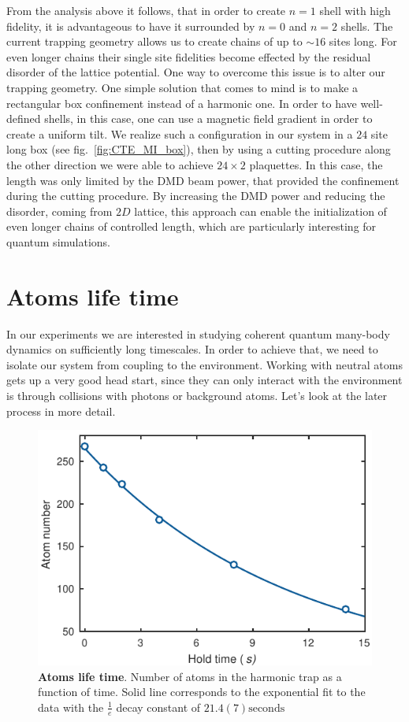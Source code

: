 From the analysis above it follows, that in order to create $n=1$ shell with high fidelity, it is advantageous to have it surrounded by $n=0$ and $n=2$ shells. The current trapping geometry allows us to create chains of up to $\sim 16$ sites long. For even longer chains their single site fidelities become effected by the residual disorder of the lattice potential. One way to overcome this issue is to alter our trapping geometry. One simple solution that comes to mind is to make a rectangular box confinement instead of a harmonic one. In order to have well-defined shells, in this case, one can use a magnetic field gradient in order to create a uniform tilt. We realize such a configuration in our system in a $24$ site long box (see fig.~\ref{fig:CTE_MI_box}), then by using a cutting procedure along the other direction we were able to achieve $24\times 2$ plaquettes. In this case, the length was only limited by the DMD beam power, that provided the confinement during the cutting procedure. By increasing the DMD power and reducing the disorder, coming from $2D$ lattice, this approach can enable the initialization of even longer chains of controlled length, which are particularly interesting for quantum simulations.

\section{Atoms life time}
In our experiments we are interested in studying coherent quantum many-body dynamics on sufficiently long timescales. In order to achieve that, we need to isolate our system from coupling to the environment. Working with neutral atoms gets up a very good head start, since they can only interact with the environment is through collisions with photons or background atoms. Let's look at the later process in more detail.

\begin{figure}[t]
	\centering
	\includegraphics[scale=1]{figures/CTE_lifetime.pdf}
	\caption{{\bf Atoms life time}. Number of atoms in the harmonic trap as  a function of time. Solid line corresponds to the exponential fit to the data with the $\frac{1}{e}$ decay constant of $21.4(7) \mathrm{seconds}$}
	\label{fig:CTE_liefetime}
\end{figure}

